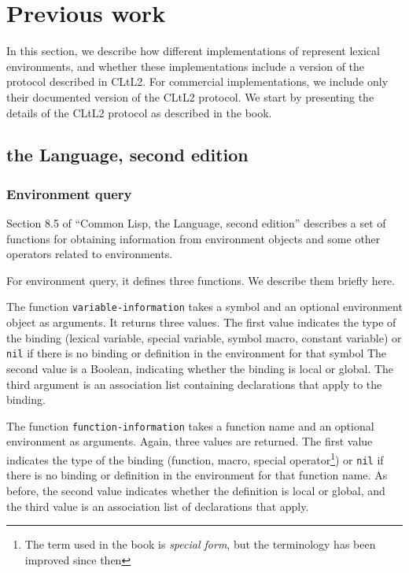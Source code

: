 \section{Previous work}

In this section, we describe how different implementations of
\commonlisp{} represent lexical environments, and whether these
implementations include a version of the protocol described in CLtL2.
For commercial implementations, we include only their documented
version of the CLtL2 protocol.  We start by presenting the details of
the CLtL2 protocol as described in the book.

\subsection{\commonlisp{} the Language, second edition}

\subsubsection{Environment query}

Section 8.5 of ``Common Lisp, the Language, second edition'' describes
a set of functions for obtaining information from environment
objects and some other operators related to environments.

For environment query, it defines three functions.  We describe them
briefly here.

The function \texttt{variable-information} takes a symbol and an
optional environment object as arguments.  It returns three values.
The first value indicates the type of the binding (lexical variable,
special variable, symbol macro, constant variable) or \texttt{nil} if
there is no binding or definition in the environment for that symbol
The second value is a Boolean, indicating whether the binding is local
or global.  The third argument is an association list containing
declarations that apply to the binding.

The function \texttt{function-information} takes a function name and
an optional environment as arguments.  Again, three values are
returned.  The first value indicates the type of the binding
(function, macro, special operator\footnote{The term used in the book
  is \emph{special form}, but the terminology has been improved since
  then}) or \texttt{nil} if there is no binding or definition in the
environment for that function name.  As before, the second value
indicates whether the definition is local or global, and the third
value is an association list of declarations that apply.

